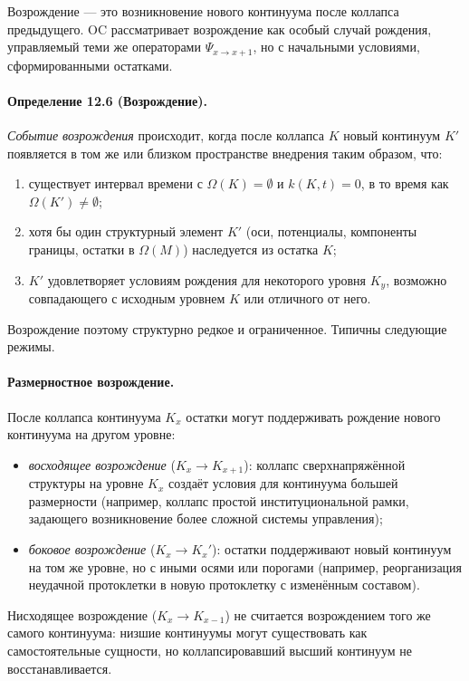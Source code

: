 Возрождение — это возникновение нового континуума после коллапса предыдущего.
OC рассматривает возрождение как особый случай рождения, управляемый теми же
операторами \(\Psi_{x\to x+1}\), но с начальными условиями, сформированными
остатками.

\paragraph{Определение 12.6 (Возрождение).}
\emph{Событие возрождения} происходит, когда после коллапса \(K\) новый
континуум \(K'\) появляется в том же или близком пространстве внедрения таким
образом, что:
\begin{enumerate}
  \item существует интервал времени с \(\Omega(K)=\emptyset\) и \(k(K,t)=0\),
        в то время как \(\Omega(K')\neq\emptyset\);
  \item хотя бы один структурный элемент \(K'\) (оси, потенциалы, компоненты
        границы, остатки в \(\Omega(M)\)) наследуется из остатка \(K\);
  \item \(K'\) удовлетворяет условиям рождения для некоторого уровня
        \(K_y\), возможно совпадающего с исходным уровнем \(K\) или
        отличного от него.
\end{enumerate}

Возрождение поэтому структурно редкое и ограниченное. Типичны следующие
режимы.

\paragraph{Размерностное возрождение.}
После коллапса континуума \(K_x\) остатки могут поддерживать рождение нового
континуума на другом уровне:
\begin{itemize}
  \item \emph{восходящее возрождение} (\(K_x\to K_{x+1}\)):
        коллапс сверхнапряжённой структуры на уровне \(K_x\) создаёт
        условия для континуума большей размерности (например, коллапс простой
        институциональной рамки, задающего возникновение более сложной
        системы управления);
  \item \emph{боковое возрождение} (\(K_x\to K_x'\)):
        остатки поддерживают новый континуум на том же уровне, но с иными
        осями или порогами (например, реорганизация неудачной протоклетки в
        новую протоклетку с изменённым составом).
\end{itemize}
Нисходящее возрождение (\(K_x\to K_{x-1}\)) не считается возрождением того
же самого континуума: низшие континуумы могут существовать как самостоятельные
сущности, но коллапсировавший высший континуум не восстанавливается.

